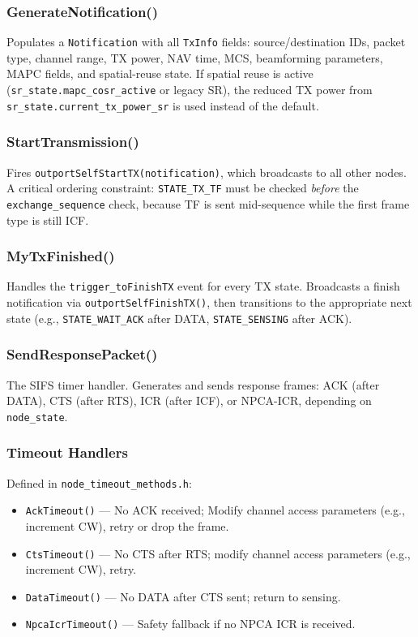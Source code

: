 \documentclass[11pt,a4paper]{article}
\begin{document}
\subsubsection{GenerateNotification()}

Populates a \texttt{Notification} with all \texttt{TxInfo} fields: source/destination IDs, packet type, channel range, TX power, NAV time, MCS, beamforming parameters, MAPC fields, and spatial-reuse state. If spatial reuse is active (\texttt{sr\_state.mapc\_cosr\_active} or legacy SR), the reduced TX power from \texttt{sr\_state.current\_tx\_power\_sr} is used instead of the default.

\subsubsection{StartTransmission()}

Fires \texttt{outportSelfStartTX(notification)}, which broadcasts to all other nodes.  A critical ordering constraint: \texttt{STATE\_TX\_TF} must be checked \emph{before} the \texttt{exchange\_sequence} check, because TF is sent mid-sequence while the first frame type is still ICF.

\subsubsection{MyTxFinished()}

Handles the \texttt{trigger\_toFinishTX} event for every TX state.  Broadcasts a finish notification via \texttt{outportSelfFinishTX()}, then transitions to the appropriate next state (e.g., \texttt{STATE\_WAIT\_ACK} after DATA, \texttt{STATE\_SENSING} after ACK).

\subsubsection{SendResponsePacket()}

The SIFS timer handler.  Generates and sends response frames: ACK (after DATA), CTS (after RTS), ICR (after ICF), or NPCA-ICR, depending on \texttt{node\_state}.

\subsubsection{Timeout Handlers}

Defined in \texttt{node\_timeout\_methods.h}:
\begin{itemize}[nosep]
  \item \texttt{AckTimeout()} --- No ACK received; Modify channel access parameters (e.g., increment CW), retry or drop the frame.
  \item \texttt{CtsTimeout()} --- No CTS after RTS; modify channel access parameters (e.g., increment CW), retry.
  \item \texttt{DataTimeout()} --- No DATA after CTS sent; return to sensing.
  \item \texttt{NpcaIcrTimeout()} --- Safety fallback if no NPCA ICR is received.
\end{itemize}
\end{document}
